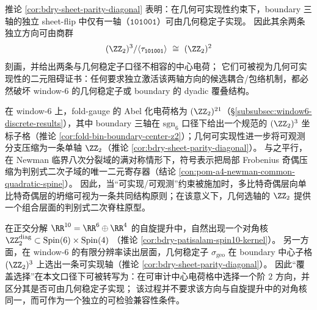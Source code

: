 \begin{remark}[两条不可几何实现的剩余中心电荷]\label{rem:bdry-nongeometric-two-charges}
推论 \ref{cor:bdry-sheet-parity-diagonal} 表明：在几何可实现性约束下，boundary 三轴的独立 sheet-flip 中仅有一轴（\(\texttt{101001}\)）可由几何稳定子实现。
因此其余两条独立方向可由商群
\[
(\ZZ_2)^3/\langle\tau_{\texttt{101001}}\rangle\ \cong\ (\ZZ_2)^2
\]
刻画，并给出两条与几何稳定子口径不相容的中心电荷；
它们可被视为几何可实现性的二元阻碍证书：任何要求独立激活该两轴方向的候选耦合/包络机制，都必然破坏 window-\(6\) 的几何稳定子或 boundary 的 dyadic 覆叠结构。
\end{remark}

\begin{remark}[从组合奇偶到判别式奇偶的单比特压缩]\label{rem:bdry-parity-compression-to-discriminant-spine}
在 window-\(6\) 上，fold-gauge 的 Abel 化电荷格为 \((\ZZ_2)^{21}\)（\S\ref{subsubsec:window6-discrete-results}），其中 boundary 三轴在 \(\mathrm{sgn}_6\) 口径下给出一个规范的 \((\ZZ_2)^3\) 坐标子格（推论 \ref{cor:fold-bin-boundary-center-z2}）；几何可实现性进一步将可观测分支压缩为一条单轴 \(\ZZ_2\)（推论 \ref{cor:bdry-sheet-parity-diagonal}）。
与之平行，在 Newman 临界八次分裂域的满对称情形下，符号表示把局部 Frobenius 奇偶压缩为判别式二次子域的唯一二元寄存器（结论 \ref{con:pom-a4-newman-common-quadratic-spine}）。
因此，当“可实现/可观测”约束被施加时，多比特奇偶层向单比特奇偶层的坍缩可视为一条共同结构原则；在该意义下，几何选轴的 \(\ZZ_2\) 提供一个组合层面的判别式二次脊柱原型。
\end{remark}

\begin{remark}\label{rem:bdry-diagonal-z2-spin-cover}
在正交分解 \(\RR^{10}=\RR^6\oplus\RR^4\) 的自旋提升中，自然出现一个对角核
\(\ZZ_2^{\mathrm{diag}}\subset \mathrm{Spin}(6)\times \mathrm{Spin}(4)\)
（推论 \ref{cor:bdry-patisalam-spin10-kernel}）。
另一方面，在 window-\(6\) 的有限分辨率读出层面，几何稳定子 \(\sigma_{\mathrm{geo}}\) 在 boundary 中心子格 \((\ZZ_2)^3\) 上选出一条可实现轴（推论 \ref{cor:bdry-sheet-parity-diagonal}）。
因此“覆盖选择”在本文口径下可被转写为：在可审计中心电荷格中选择一个阶 \(2\) 方向，并区分其是否可由几何稳定子实现；
该过程并不要求该方向与自旋提升中的对角核同一，而可作为一个独立的可检验兼容性条件。
\end{remark}

